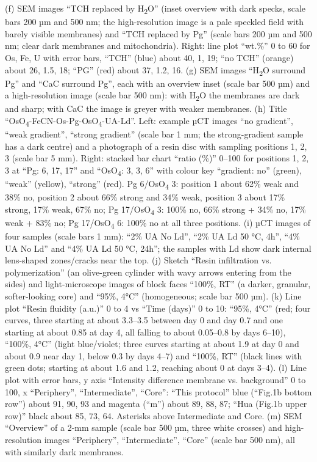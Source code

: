 \documentclass{article}
\begin{document}
{(f) SEM images ``TCH replaced by H\textsubscript{2}O'' (inset overview with dark specks, scale bars 200 µm and 500 nm; the high-resolution image is a pale speckled field with barely visible membranes) and ``TCH replaced by Pg'' (scale bars 200 µm and 500 nm; clear dark membranes and mitochondria). Right: line plot ``wt.\%'' 0 to 60 for Os, Fe, U with error bars, ``TCH'' (blue) about 40, 1, 19; ``no TCH'' (orange) about 26, 1.5, 18; ``PG'' (red) about 37, 1.2, 16.
(g) SEM images ``H\textsubscript{2}O surround Pg'' and ``CaC surround Pg'', each with an overview inset (scale bar 500 µm) and a high-resolution image (scale bar 500 nm): with H\textsubscript{2}O the membranes are dark and sharp; with CaC the image is greyer with weaker membranes.
(h) Title ``OsO\textsubscript{4}-FeCN-Os-Pg-OsO\textsubscript{4}-UA-Ld''. Left: example µCT images ``no gradient'', ``weak gradient'', ``strong gradient'' (scale bar 1 mm; the strong-gradient sample has a dark centre) and a photograph of a resin disc with sampling positions 1, 2, 3 (scale bar 5 mm). Right: stacked bar chart ``ratio (\%)'' 0–100 for positions 1, 2, 3 at ``Pg: 6, 17, 17'' and ``OsO\textsubscript{4}: 3, 3, 6'' with colour key ``gradient: no'' (green), ``weak'' (yellow), ``strong'' (red). Pg 6/OsO\textsubscript{4} 3: position 1 about 62\% weak and 38\% no, position 2 about 66\% strong and 34\% weak, position 3 about 17\% strong, 17\% weak, 67\% no; Pg 17/OsO\textsubscript{4} 3: 100\% no, 66\% strong + 34\% no, 17\% weak + 83\% no; Pg 17/OsO\textsubscript{4} 6: 100\% no at all three positions.
(i) µCT images of four samples (scale bars 1 mm): ``2\% UA No Ld'', ``2\% UA Ld 50 °C, 4h'', ``4\% UA No Ld'' and ``4\% UA Ld 50 °C, 24h''; the samples with Ld show dark internal lens-shaped zones/cracks near the top.
(j) Sketch ``Resin infiltration vs. polymerization'' (an olive-green cylinder with wavy arrows entering from the sides) and light-microscope images of block faces ``100\%, RT'' (a darker, granular, softer-looking core) and ``95\%, 4°C'' (homogeneous; scale bar 500 µm).
(k) Line plot ``Resin fluidity (a.u.)'' 0 to 4 vs ``Time (days)'' 0 to 10: ``95\%, 4°C'' (red; four curves, three starting at about 3.3–3.5 between day 0 and day 0.7 and one starting at about 0.85 at day 4, all falling to about 0.05–0.8 by days 6–10), ``100\%, 4°C'' (light blue/violet; three curves starting at about 1.9 at day 0 and about 0.9 near day 1, below 0.3 by days 4–7) and ``100\%, RT'' (black lines with green dots; starting at about 1.6 and 1.2, reaching about 0 at days 3–4).
(l) Line plot with error bars, y axis ``Intensity difference membrane vs. background'' 0 to 100, x ``Periphery'', ``Intermediate'', ``Core'': ``This protocol'' blue (``Fig.1b bottom row'') about 91, 90, 93 and magenta (``m'') about 89, 88, 87; ``Hua (Fig.1b upper row)'' black about 85, 73, 64. Asterisks above Intermediate and Core.
(m) SEM ``Overview'' of a 2-mm sample (scale bar 500 µm, three white crosses) and high-resolution images ``Periphery'', ``Intermediate'', ``Core'' (scale bar 500 nm), all with similarly dark membranes.}
\end{document}

